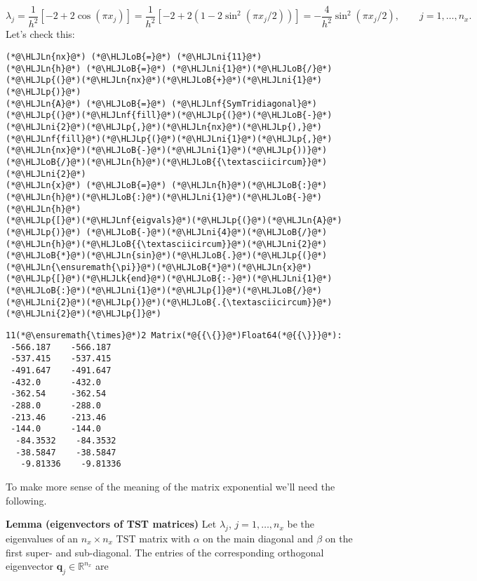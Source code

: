 \documentclass[12pt,landscape]{article}
\newcommand{\HLJLk}[1]{\textcolor[RGB]{148,91,176}{\textbf{#1}}}
\newcommand{\HLJLn}[1]{#1}
\newcommand{\HLJLnf}[1]{\textcolor[RGB]{66,102,213}{#1}}
\newcommand{\HLJLni}[1]{\textcolor[RGB]{59,151,46}{#1}}
\newcommand{\HLJLoB}[1]{\textcolor[RGB]{102,102,102}{\textbf{#1}}}
\newcommand{\HLJLp}[1]{#1}
\begin{document}
{\[
\lambda_j = \frac{1}{h^2}\left[-2 + 2\cos\left(\pi x_j  \right)  \right] = \frac{1}{h^2}\left[-2 + 2\left(1 - 2\sin^2\left(\pi x_j/2  \right)\right)  \right] = -\frac{4}{h^2}\sin^2(\pi x_j/2), \qquad j = 1, \ldots, n_x.
\]
Let's check this:


\begin{lstlisting}
(*@\HLJLn{nx}@*) (*@\HLJLoB{=}@*) (*@\HLJLni{11}@*)
(*@\HLJLn{h}@*) (*@\HLJLoB{=}@*) (*@\HLJLni{1}@*)(*@\HLJLoB{/}@*)(*@\HLJLp{(}@*)(*@\HLJLn{nx}@*)(*@\HLJLoB{+}@*)(*@\HLJLni{1}@*)(*@\HLJLp{)}@*)
(*@\HLJLn{A}@*) (*@\HLJLoB{=}@*) (*@\HLJLnf{SymTridiagonal}@*)(*@\HLJLp{(}@*)(*@\HLJLnf{fill}@*)(*@\HLJLp{(}@*)(*@\HLJLoB{-}@*)(*@\HLJLni{2}@*)(*@\HLJLp{,}@*)(*@\HLJLn{nx}@*)(*@\HLJLp{),}@*)(*@\HLJLnf{fill}@*)(*@\HLJLp{(}@*)(*@\HLJLni{1}@*)(*@\HLJLp{,}@*)(*@\HLJLn{nx}@*)(*@\HLJLoB{-}@*)(*@\HLJLni{1}@*)(*@\HLJLp{))}@*)(*@\HLJLoB{/}@*)(*@\HLJLn{h}@*)(*@\HLJLoB{{\textasciicircum}}@*)(*@\HLJLni{2}@*)
(*@\HLJLn{x}@*) (*@\HLJLoB{=}@*) (*@\HLJLn{h}@*)(*@\HLJLoB{:}@*)(*@\HLJLn{h}@*)(*@\HLJLoB{:}@*)(*@\HLJLni{1}@*)(*@\HLJLoB{-}@*)(*@\HLJLn{h}@*)
(*@\HLJLp{[}@*)(*@\HLJLnf{eigvals}@*)(*@\HLJLp{(}@*)(*@\HLJLn{A}@*)(*@\HLJLp{)}@*) (*@\HLJLoB{-}@*)(*@\HLJLni{4}@*)(*@\HLJLoB{/}@*)(*@\HLJLn{h}@*)(*@\HLJLoB{{\textasciicircum}}@*)(*@\HLJLni{2}@*)(*@\HLJLoB{*}@*)(*@\HLJLn{sin}@*)(*@\HLJLoB{.}@*)(*@\HLJLp{(}@*)(*@\HLJLn{\ensuremath{\pi}}@*)(*@\HLJLoB{*}@*)(*@\HLJLn{x}@*)(*@\HLJLp{[}@*)(*@\HLJLk{end}@*)(*@\HLJLoB{:-}@*)(*@\HLJLni{1}@*)(*@\HLJLoB{:}@*)(*@\HLJLni{1}@*)(*@\HLJLp{]}@*)(*@\HLJLoB{/}@*)(*@\HLJLni{2}@*)(*@\HLJLp{)}@*)(*@\HLJLoB{.{\textasciicircum}}@*)(*@\HLJLni{2}@*)(*@\HLJLp{]}@*)
\end{lstlisting}

\begin{lstlisting}
11(*@\ensuremath{\times}@*)2 Matrix(*@{{\{}}@*)Float64(*@{{\}}}@*):
 -566.187    -566.187
 -537.415    -537.415
 -491.647    -491.647
 -432.0      -432.0
 -362.54     -362.54
 -288.0      -288.0
 -213.46     -213.46
 -144.0      -144.0
  -84.3532    -84.3532
  -38.5847    -38.5847
   -9.81336    -9.81336
\end{lstlisting}


To make more sense of the meaning of the matrix exponential we'll need the following.

\textbf{Lemma (eigenvectors of TST matrices)}  Let $\lambda_j$, $j = 1, \ldots, n_x$ be the eigenvalues of an $n_x \times n_x$ TST matrix with $\alpha$ on the main diagonal and $\beta$ on the first super- and sub-diagonal.  The entries of the corresponding orthogonal eigenvector $\mathbf{q}_j \in \mathbb{R}^{n_x}$ are

}
\end{document}
